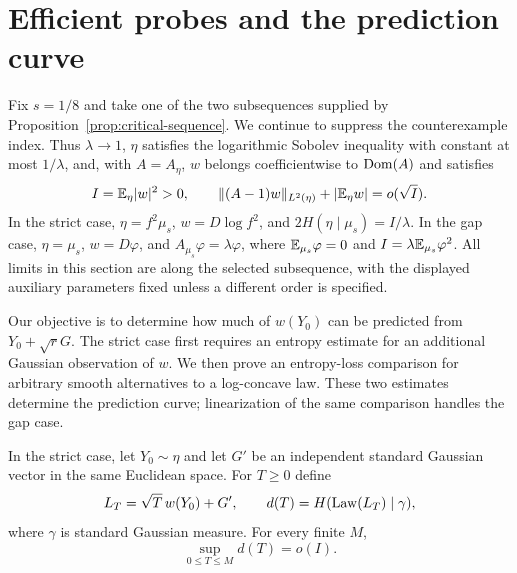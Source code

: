 \section{Efficient probes and the prediction curve}
\label{sec:prediction}

Fix $s=1/8$ and take one of the two subsequences supplied by
Proposition~\ref{prop:critical-sequence}.  We continue to suppress the
counterexample index.  Thus $\lambda\to1$, $\eta$ satisfies the logarithmic
Sobolev inequality with constant at most $1/\lambda$, and, with
$A=A_\eta$, $w$ belongs coefficientwise to $\operatorname{Dom}(A)$ and satisfies
\begin{equation}
 I=\mathbb E_\eta|w|^2>0,
 \qquad \|(A-1)w\|_{L^2(\eta)}+|\mathbb E_\eta w|=o(\sqrt I).
 \label{eq:prediction-input}
\end{equation}
In the strict case, $\eta=f^2\mu_s$, $w=D\log f^2$, and
$2H(\eta\mid\mu_s)=I/\lambda$.  In the gap case,
$\eta=\mu_s$, $w=D\varphi$, and
$A_{\mu_s}\varphi=\lambda\varphi$, where
$\mathbb E_{\mu_s}\varphi=0$ and $I=\lambda\mathbb E_{\mu_s}\varphi^2$.
All limits in this section are along the selected subsequence, with the
displayed auxiliary parameters fixed unless a different order is specified.

Our objective is to determine how much of $w(Y_0)$ can be predicted from
$Y_0+\sqrt rG$.  The strict case first requires an entropy estimate for an
additional Gaussian observation of $w$.  We then prove an entropy-loss
comparison for arbitrary smooth alternatives to a log-concave law.  These
two estimates determine the prediction curve; linearization of the same
comparison handles the gap case.

\begin{lemma}
\label{lem:efficient-probes}
In the strict case, let $Y_0\sim\eta$ and let $G'$ be an independent
standard Gaussian vector in the same Euclidean space.  For $T\ge0$ define
\[
 L_T=\sqrt T\,w(Y_0)+G',\qquad
 d(T)=H(\operatorname{Law}(L_T)\mid\gamma),
\]
where $\gamma$ is standard Gaussian measure.  For every finite $M$,
\begin{equation}
 \sup_{0\le T\le M}d(T)=o(I).
 \label{eq:efficient-probes}
\end{equation}
\end{lemma}

